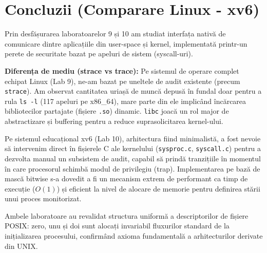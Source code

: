 \documentclass[12pt,a4paper]{article}
\begin{document}
\newpage

\section{Concluzii (Comparare Linux - xv6)}
Prin desfășurarea laboratoarelor 9 și 10 am studiat interfața nativă de comunicare dintre aplicațiile din user-space și kernel, implementată printr-un perete de securitate bazat pe apeluri de sistem (syscall-uri).

\textbf{Diferența de mediu (strace vs trace):}
Pe sistemul de operare complet echipat Linux (Lab 9), ne-am bazat pe uneltele de audit existente (precum \texttt{strace}). Am observat cantitatea uriașă de muncă depusă în fundal doar pentru a rula \texttt{ls -l} (117 apeluri pe x86\_64), mare parte din ele implicând încărcarea bibliotecilor partajate (fișiere \texttt{.so}) dinamic. \texttt{libc} joacă un rol major de abstractizare și buffering pentru a reduce suprasolicitarea kernel-ului.

Pe sistemul educațional xv6 (Lab 10), arhitectura fiind minimalistă, a fost nevoie să intervenim direct în fișierele C ale kernelului (\texttt{sysproc.c}, \texttt{syscall.c}) pentru a dezvolta manual un subsistem de audit, capabil să prindă tranzițiile în momentul în care procesorul schimbă modul de privilegiu (trap). Implementarea pe bază de mască bitwise s-a dovedit a fi un mecanism extrem de performant ca timp de execuție ($O(1)$) și eficient la nivel de alocare de memorie pentru definirea stării unui proces monitorizat.

Ambele laboratoare au revalidat structura uniformă a descriptorilor de fișiere POSIX: zero, unu și doi sunt alocați invariabil fluxurilor standard de la inițializarea procesului, confirmând axioma fundamentală a arhitecturilor derivate din UNIX.
\end{document}

